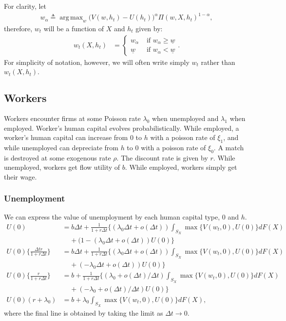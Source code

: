 \documentclass[11pt]{article}
\DeclareMathOperator*{\argmax}{arg\,max}
\begin{document}
For clarity, let
\begin{align*}
    w_{\alpha} \triangleq \argmax_w \big ( V(w,h_t) - U(h_t) \big
        )^{\alpha} \Pi(w,X,h_t)^{1-\alpha}
,\end{align*}
therefore, $w_t$ will be a function of $X$ and $h_t$ given by:
\begin{align*}
    w_t(X,h_t) &= \begin{cases}
        w_{\alpha} &\text{ if } w_\alpha \ge \underline{w} \\
        \underline{w} &\text{ if } w_\alpha < \underline{w}
    \end{cases}
.\end{align*}
For simplicity of notation, however, we will often write simply $w_t$ rather than
$w_t(X,h_t)$.


\subsection[Workers]{Workers}%
\label{sub:workers}

Workers encounter firms at some Poisson rate
$\lambda_0$ when unemployed and $\lambda_1$ when employed. Worker's human
capital evolves probabilistically. While employed, a worker's human capital
can increase from $0$ to $h$ with a poisson rate of  $\xi_1$, and while
unemployed can depreciate from $h$ to $0$ with a poisson rate of $\xi_0$. A
match is destroyed at some exogenous rate $\rho$. The discount rate is
given by $r$. While unemployed, workers get flow utility of $b$. While
employed, workers simply get their wage.

\subsubsection[Unemployment]{Unemployment}%
\label{subsub:unemployment}
We can express the value of unemployment by each human capital type, $0$
and $h$.
\begin{align*}
    U(0) &= b \Delta t + \frac{1}{1+r\Delta t} \{ (\lambda_0 \Delta t
        + o(\Delta t)) \int_{S_X}^{} \max
    \{V(w_t, 0), U(0)\} dF(X) \\
         &\;\;\;\;+ (1-(\lambda_0\Delta t + o(\Delta t)) U(0)  \} \\
         U(0) \{\frac{\Delta t r}{1+r \Delta t} \} 
    &= b \Delta t + \frac{1}{1+r\Delta t} \{ (\lambda_0 \Delta t
        + o(\Delta t)) \int_{S_X}^{} \max
    \{V(w_t, 0), U(0)\} dF(X) \\
    &\;\;\;\;+ (-\lambda_0\Delta t + o(\Delta t)) U(0)  \} \\
    U(0) \{\frac{r}{1+r \Delta t} \} 
    &= b + \frac{1}{1+r\Delta t} \{ (\lambda_0
        + o(\Delta t)/\Delta t) \int_{S_X}^{} \max
    \{V(w_t, 0), U(0)\} dF(X)  \\
    &\;\;\;\;+ (-\lambda_0 + o(\Delta t)/\Delta t) U(0)  \} \\
         U(0) (r + \lambda_0)
    &= b +  \lambda_0 \int_{S_X}^{} \max
    \{V(w_t, 0), U(0)\} dF(X)
,\end{align*}
where the final line is obtained by taking the limit as $\Delta t \rightarrow
0$.
\end{document}
